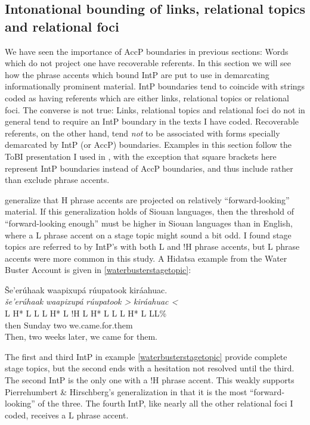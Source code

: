 \documentclass[output=paper]{LSP/langsci}
\begin{document}
\subsection{Intonational bounding of links, relational topics and relational foci}\label{intonationalbounding}
	
	We have seen the importance of AccP boundaries in previous sections: Words which do not project one have recoverable referents. In this section we will see how the phrase accents which bound IntP are put to use in demarcating informationally prominent material. IntP boundaries tend to coincide with strings coded as having referents which are either links, relational topics or relational foci. The converse is not true: Links, relational topics and relational foci do not in general tend to require an IntP boundary in the texts I have coded. Recoverable referents, on the other hand, tend \emph{not} to be associated with forms specially demarcated by IntP (or AccP) boundaries. Examples in this section follow the ToBI presentation I used in , with the exception that square brackets here represent IntP boundaries instead of AccP boundaries, and thus include rather than exclude phrase accents.
	
	\citet{PierrehumbertHirschberg1990} generalize that H phrase accents are projected on relatively “forward-looking” material. If this generalization holds of Siouan languages, then the threshold of “forward-looking enough” must be higher in Siouan languages than in English, where a L phrase accent on a stage topic might sound a bit odd. I found stage topics are referred to by IntP’s with both L and !H phrase accents, but L phrase accents were more common in this study. A Hidatsa example from the Water Buster Account is given in \ref{waterbusterstagetopic}:
	
\ea\label{waterbusterstagetopic}
Še’erúhaak waapixupá rúupatook kiráahuac.\footnotemark\\
\glll	\emph{še’erúhaak}		\emph{waapixupá}		\emph{rúupatook >	}	\emph{kiráahuac <}\\
	{\ob L H* L L\cb}		{\ob L H* L !H\cb}		{\ob L H* L L\cb}		{\ob L H* L L\cb{}L\%}\\
	then				Sunday			two				we.came.for.them\\
\glt	Then, two weeks later, we came for them.
\z

The first and third IntP in example \ref{waterbusterstagetopic} provide complete stage topics, but the second ends with a hesitation not resolved until the third. The second IntP is the only one with a !H phrase accent. This weakly supports Pierrehumbert \& Hirschberg’s generalization in that it is the most “forward-looking” of the three. The fourth IntP, like nearly all the other relational foci I coded, receives a L phrase accent.
\end{document}
